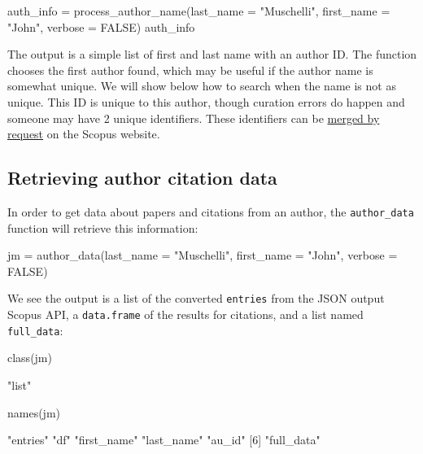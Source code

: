 \begin{Schunk}
\begin{Sinput}
auth_info = process_author_name(last_name = "Muschelli", first_name = "John",
                                verbose = FALSE)
auth_info
\end{Sinput}
\end{Schunk}

The output is a simple list of first and last name with an author ID.
The function chooses the first author found, which may be useful if the
author name is somewhat unique. We will show below how to search when
the name is not as unique. This ID is unique to this author, though
curation errors do happen and someone may have 2 unique identifiers.
These identifiers can be
\href{https://service.elsevier.com/app/answers/detail/a_id/14550/supporthub/scopuscontent/kw/merge/}{merged
by request} on the Scopus website.

\hypertarget{retrieving-author-citation-data}{%
\subsection{Retrieving author citation
data}\label{retrieving-author-citation-data}}

In order to get data about papers and citations from an author, the
\texttt{author\_data} function will retrieve this information:

\begin{Schunk}
\begin{Sinput}
jm = author_data(last_name = "Muschelli", first_name = "John", verbose = FALSE)
\end{Sinput}
\end{Schunk}

We see the output is a list of the converted \texttt{entries} from the
JSON output Scopus API, a \texttt{data.frame} of the results for
citations, and a list named \texttt{full\_data}:

\begin{Schunk}
\begin{Sinput}
class(jm)
\end{Sinput}
\begin{Soutput}
[1] "list"
\end{Soutput}
\begin{Sinput}
names(jm)
\end{Sinput}
\begin{Soutput}
[1] "entries"    "df"         "first_name" "last_name"  "au_id"     
[6] "full_data" 
\end{Soutput}
\end{Schunk}

